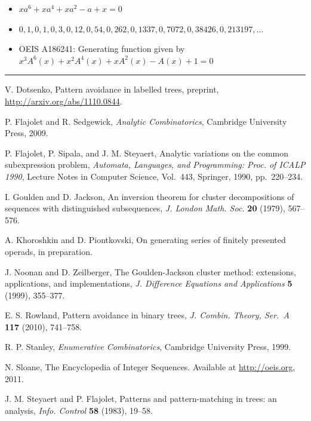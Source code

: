 \documentclass[12pt]{article}
\begin{document}
\begin{itemize}
\item $xa^6+xa^4+xa^2-a+x=0$
\item $0, 1, 0, 1, 0, 3, 0, 12, 0, 54, 0, 262, 0, 1337, 0, 7072, 0, 38426, 0, 213197, \dots$
\item OEIS A186241: Generating function given by $x^3A^6(x)+x^2A^4(x)+xA^2(x)-A(x)+1=0$
\end{itemize}

\hrule


\begin{thebibliography}{1}

 V. Dotsenko, Pattern avoidance in labelled trees, preprint, \url{http://arxiv.org/abs/1110.0844}. 

 P. Flajolet and R. Sedgewick, \emph{Analytic Combinatorics}, Cambridge University Press, 2009.

 P. Flajolet, P. Sipala, and J. M. Steyaert, Analytic
variations on the common subexpression problem, {\it Automata,
Languages, and Programming:  Proc. of ICALP 1990},
Lecture Notes in Computer Science, Vol.\ 443,
Springer, 1990, pp.\ 220--234.

 I. Goulden and D. Jackson, An inversion theorem for
cluster decompositions of sequences with distinguished subsequences,
\emph{J. London Math. Soc.} 
\textbf{20} (1979), 567--576.

 A. Khoroshkin and D. Piontkovski, On generating series
of finitely presented operads, in preparation.

 J. Noonan and D. Zeilberger, The Goulden-Jackson cluster
method: extensions, applications, and implementations, \emph{J.
Difference Equations and Applications} \textbf{5} (1999), 355--377.

 E. S. Rowland, Pattern avoidance in binary trees,
\emph{J. Combin. Theory, Ser.\ A} \textbf{117} (2010),
741--758.

 R. P. Stanley, \emph{Enumerative Combinatorics},
Cambridge University Press, 1999.

 N. Sloane, The Encyclopedia of Integer Sequences.
Available at \url{http://oeis.org}, 2011.

 J. M. Steyaert and P. Flajolet, Patterns and
pattern-matching in trees: an analysis, \emph{Info. Control}
\textbf{58} (1983), 19--58.

\end{thebibliography}
\end{document}
